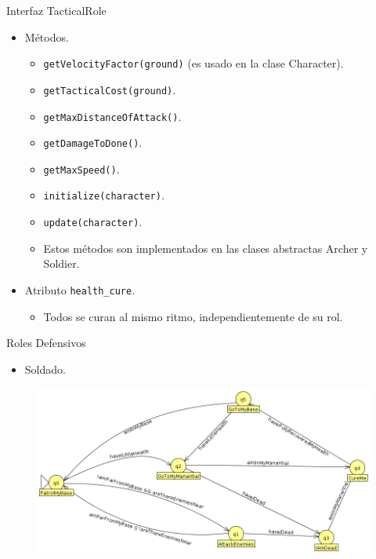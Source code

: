 \documentclass[10pt]{beamer}
\begin{document}
\begin{frame}{Interfaz TacticalRole}
\begin{itemize}[<+- | alert@+>]
	\item Métodos.
	\begin{itemize}[<+- | alert@+>]
  		\item \texttt{getVelocityFactor(ground)} (es usado en la clase Character).
  		\item \texttt{getTacticalCost(ground)}.
  		\item \texttt{getMaxDistanceOfAttack()}.
  		\item \texttt{getDamageToDone()}.
  		\item \texttt{getMaxSpeed()}.
  		\item \texttt{initialize(character)}.
  		\item \texttt{update(character)}.
  		\item Estos métodos son implementados en las clases abstractas Archer y Soldier.
 	\end{itemize}
 	\item Atributo \texttt{health\_cure}.
 	\begin{itemize}[<+- | alert@+>]
  		\item Todos se curan al mismo ritmo, independientemente de su rol.
 	\end{itemize}
\end{itemize}
\end{frame}

\begin{frame}{Roles Defensivos}
\begin{itemize}[<+- | alert@+>]
	\item Soldado.
\end{itemize}
\begin{figure}[!th]
	\includegraphics[scale=0.38]{images/defensive-soldier}
\end{figure}
\end{frame}
\end{document}
